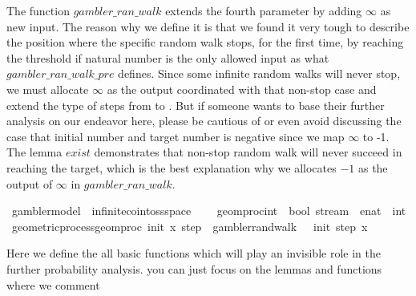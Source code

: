 \begin{isabellebody}
\begin{isamarkuptext}%
The function $gambler\_ran\_walk$ extends the fourth parameter by adding $\infty$ as new input.
The reason why we define it is that we found it very tough to describe the position where the specific
random walk stops, for the first time, by reaching the threshold if natural number is the only allowed 
input as what $gambler\_ran\_walk\_pre$ defines. Since some infinite random walks will never stop, 
we must allocate $\infty$ as the output coordinated with that non-stop case and extend the type of 
steps from  to . But if someone wants to base their further analysis on our endeavor here, 
please be cautious of or even avoid discussing the case that initial number and target number is 
negative since we map $\infty$ to -1. The lemma $exist$ demonstrates that non-stop random walk will
never succeed in reaching the target, which is the best explanation why we allocates $-1$ as the output
of $\infty$ in $gambler\_ran\_walk$.%
\end{isamarkuptext}\isamarkuptrue%
\isamarkupfalse%
\ gambler{\isacharunderscore}{\kern0pt}model\ {\isacharequal}{\kern0pt}\ infinite{\isacharunderscore}{\kern0pt}coin{\isacharunderscore}{\kern0pt}toss{\isacharunderscore}{\kern0pt}space\ {\isacharplus}{\kern0pt}\isanewline
\ \ \ geom{\isacharunderscore}{\kern0pt}proc{\isacharcolon}{\kern0pt}{\isacharcolon}{\kern0pt}{\isachardoublequoteopen}int\ {\isasymRightarrow}\ bool\ stream\ {\isasymRightarrow}\ enat\ {\isasymRightarrow}\ int{\isachardoublequoteclose}\isanewline
{}\ geometric{\isacharunderscore}{\kern0pt}process{\isacharcolon}{\kern0pt}{\isachardoublequoteopen}geom{\isacharunderscore}{\kern0pt}proc\ init\ x\ step\ {\isacharequal}{\kern0pt}\ gambler{\isacharunderscore}{\kern0pt}rand{\isacharunderscore}{\kern0pt}walk\ {}\ {\isacharparenleft}{\kern0pt}{\isacharminus}{\kern0pt}{}{\isacharparenright}{\kern0pt}\ init\ step\ x{\isachardoublequoteclose}\isanewline
\isanewline
{}%
\isadelimdocument
%
\endisadelimdocument
%
\isatagdocument
%
\isamarkuptrue%
%
\endisatagdocument
{\isafolddocument}%
%
\isadelimdocument
%
\endisadelimdocument
%
\begin{isamarkuptext}%
Here we define the all basic functions which will play an invisible role in the further probability analysis.
you can just focus on the lemmas and functions where we comment%
\end{isamarkuptext}\isamarkuptrue%

\end{isabellebody}
